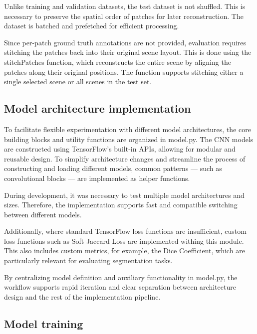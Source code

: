 {Unlike training and validation datasets, the test dataset is not shuffled. This is necessary to preserve the spatial order of patches for later reconstruction. The dataset is batched and prefetched for efficient processing.

Since per-patch ground truth annotations are not provided, evaluation requires stitching the patches back into their original scene layout. This is done using the stitchPatches function, which reconstructs the entire scene by aligning the patches along their original positions. The function supports stitching either a single selected scene or all scenes in the test set.

\subsection{Model architecture implementation}

To facilitate flexible experimentation with different model architectures, the core building blocks and utility functions are organized in model.py. The CNN models are constructed using TensorFlow’s built-in APIs, allowing for modular and reusable design. To simplify architecture changes and streamline the process of constructing and loading different models, common patterns --- such as convolutional blocks --- are implemented as helper functions.

During development, it was necessary to test multiple model architectures and sizes. Therefore, the implementation supports fast and compatible switching between different models.

Additionally, where standard TensorFlow loss functions are insufficient, custom loss functions such as Soft Jaccard Loss are implemented withing this module. This also includes custom metrics, for example, the Dice Coefficient, which are particularly relevant for evaluating segmentation tasks.

By centralizing model definition and auxiliary functionality in model.py, the workflow supports rapid iteration and clear separation between architecture design and the rest of the implementation pipeline.


\subsection{Model training}

}
